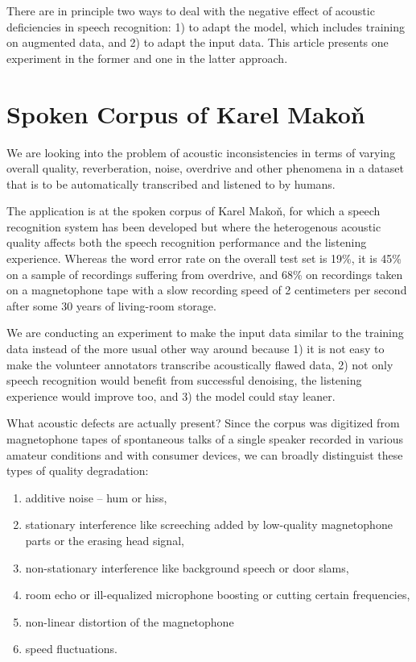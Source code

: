 \documentclass[runningheads]{llncs}
\begin{document}
There are in principle two ways to deal with the negative effect of acoustic
deficiencies in speech recognition: 1) to adapt the model, which includes
training on augmented data, and 2) to adapt the input data. This article
presents one experiment in the former and one in the latter approach.

\section{Spoken Corpus of Karel Makoň}

We are looking into the problem of acoustic inconsistencies in terms of varying
overall quality, reverberation, noise, overdrive and other phenomena in a
dataset that is to be automatically transcribed and listened to by humans.

The application is at the spoken corpus of Karel Makoň\cite{makondata}, for which
a speech recognition system has been developed\cite{kruuza2012making} but where
the heterogenous acoustic quality affects both the speech recognition
performance and the listening experience. Whereas the word error rate on the
overall test set is 19\%, it is 45\% on a sample of recordings suffering from
overdrive, and 68\% on recordings taken on a magnetophone tape with a slow
recording speed of 2 centimeters per second after some 30 years of living-room
storage.

We are conducting an experiment to make the input data similar to the training
data instead of the more usual other way around because 1) it is not easy to
make the volunteer annotators transcribe acoustically flawed data, 2) not only
speech recognition would benefit from successful denoising, the listening
experience would improve too, and 3) the model could stay leaner.

What acoustic defects are actually present? Since the corpus was digitized from
magnetophone tapes of spontaneous talks of a single speaker recorded in various
amateur conditions and with consumer devices, we can broadly distinguist these
types of quality degradation:
\begin{enumerate}
\item{additive noise -- hum or hiss,}
\item{
    stationary interference like screeching added by low-quality magnetophone
    parts or the erasing head signal,
}
\item{non-stationary interference like background speech or door slams,}
\item{
    room echo or ill-equalized microphone boosting or cutting certain
    frequencies,
}
\item{non-linear distortion of the magnetophone}
\item{speed fluctuations.}
\end{enumerate}
\end{document}
